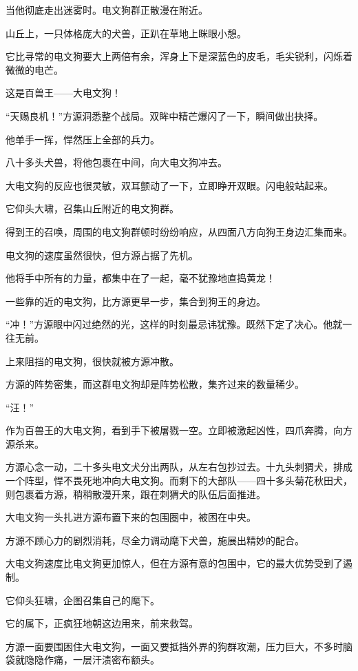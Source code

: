 \begin{this_body}
当他彻底走出迷雾时。电文狗群正散漫在附近。

山丘上，一只体格庞大的犬兽，正趴在草地上眯眼小憩。

它比寻常的电文狗要大上两倍有余，浑身上下是深蓝色的皮毛，毛尖锐利，闪烁着微微的电芒。

这是百兽王——大电文狗！

“天赐良机！”方源洞悉整个战局。双眸中精芒爆闪了一下，瞬间做出抉择。

他单手一挥，悍然压上全部的兵力。

八十多头犬兽，将他包裹在中间，向大电文狗冲去。

大电文狗的反应也很灵敏，双耳颤动了一下，立即睁开双眼。闪电般站起来。

它仰头大啸，召集山丘附近的电文狗群。

得到王的召唤，周围的电文狗群顿时纷纷响应，从四面八方向狗王身边汇集而来。

电文狗的速度虽然很快，但方源占据了先机。

他将手中所有的力量，都集中在了一起，毫不犹豫地直捣黄龙！

一些靠的近的电文狗，比方源更早一步，集合到狗王的身边。

“冲！”方源眼中闪过绝然的光，这样的时刻最忌讳犹豫。既然下定了决心。他就一往无前。

上来阻挡的电文狗，很快就被方源冲散。

方源的阵势密集，而这群电文狗却是阵势松散，集齐过来的数量稀少。

“汪！”

作为百兽王的大电文狗，看到手下被屠戮一空。立即被激起凶性，四爪奔腾，向方源杀来。

方源心念一动，二十多头电文犬分出两队，从左右包抄过去。十九头刺猬犬，排成一个阵型，悍不畏死地冲向大电文狗。而剩下的大部队——四十多头菊花秋田犬，则包裹着方源，稍稍散漫开来，跟在刺猬犬的队伍后面推进。

大电文狗一头扎进方源布置下来的包围圈中，被困在中央。

方源不顾心力的剧烈消耗，尽全力调动麾下犬兽，施展出精妙的配合。

大电文狗速度比电文狗更加惊人，但在方源有意的包围中，它的最大优势受到了遏制。

它仰头狂啸，企图召集自己的麾下。

它的属下，正疯狂地朝这边用来，前来救驾。

方源一面要围困住大电文狗，一面又要抵挡外界的狗群攻潮，压力巨大，不多时脑袋就隐隐作痛，一层汗渍密布额头。


\end{this_body}
